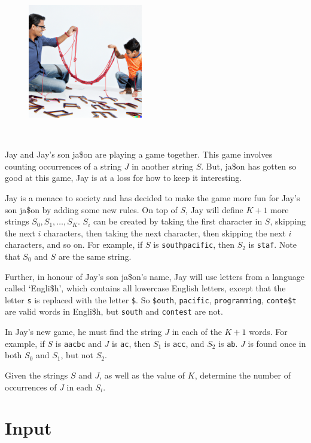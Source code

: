 
\begin{figure}
 \includegraphics[width=50mm]{img.png}
\end{figure}
~

Jay and Jay's son ja\$on are playing a game together. This game involves counting
occurrences of a string $J$ in another string $S$. But, ja\$on has
gotten so good at this game, Jay is at a loss for how to keep it interesting.

Jay is a menace to society and has decided to make the game more fun for Jay's
son ja\$on by adding some new rules. On top of $S$, Jay will define $K + 1$ more strings
$S_0, S_1, \dots, S_K$. $S_i$ can be created by taking the first character in $S$, skipping the next $i$ characters, then taking the next character, then skipping the next $i$ characters, and so on. For example, if $S$ is \texttt{southpacific}, then $S_2$ is \texttt{staf}. Note that $S_0$ and $S$ are the same string.

Further, in honour of Jay's son ja\$on's name, Jay will use letters from a language called `Engli\$h', which contains all lowercase English letters, except that the letter \texttt{s} is replaced with the letter \texttt{\$}. So \texttt{\$outh}, \texttt{pacific}, \texttt{programming}, \texttt{conte\$t} are valid words in Engli\$h, but \texttt{south} and \texttt{contest} are not.

In Jay's new game, he must find the string $J$ in each of the $K+1$ words.
For example, if $S$ is \texttt{aacbc} and $J$ is \texttt{ac}, then $S_1$ is \texttt{acc}, and $S_2$ is \texttt{ab}. $J$ is found once in both $S_0$ and $S_1$, but not $S_2$.

Given the strings $S$ and $J$, as well as the value of $K$, determine the number of occurrences of $J$ in each $S_i$.


\section*{Input}

